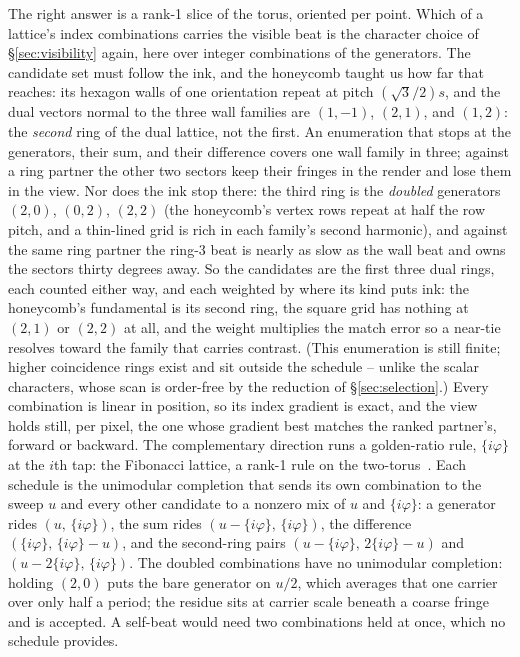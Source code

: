 The right answer is a rank-1 slice of the torus, oriented per point. Which of a
lattice's index combinations carries the visible beat is the character choice
of \S\ref{sec:visibility} again, here over integer combinations of the generators. The candidate
set must follow the ink, and the honeycomb taught us how far that reaches: its
hexagon walls of one orientation repeat at pitch $(\sqrt3/2)s$, and the dual
vectors normal to the three wall families are $(1,-1)$, $(2,1)$, and
$(1,2)$: the \emph{second} ring of the dual lattice, not the first. An
enumeration that stops at the generators, their sum, and their difference
covers one wall family in three; against a ring partner the other two sectors
keep their fringes in the render and lose them in the view. Nor does the ink
stop there: the third ring is the \emph{doubled} generators $(2,0)$, $(0,2)$,
$(2,2)$ (the honeycomb's vertex rows repeat at half the row pitch, and a
thin-lined grid is rich in each family's second harmonic), and against the
same ring partner the ring-3 beat is nearly as slow as the wall beat and owns
the sectors thirty degrees away. So the candidates are the first three dual
rings, each counted either way, and each weighted by where its kind puts
ink: the honeycomb's fundamental is its second ring, the square grid has
nothing at $(2,1)$ or $(2,2)$ at all, and the weight multiplies the match
error so a near-tie resolves toward the family that carries contrast. (This
enumeration is still finite; higher coincidence rings exist and sit outside
the schedule -- unlike the scalar characters, whose scan is order-free by the
reduction of \S\ref{sec:selection}.)
Every combination is linear in position, so its index gradient is exact, and the
view holds still, per pixel, the one whose gradient best matches the ranked
partner's, forward or backward. The complementary direction runs a golden-ratio
rule, $\{i\varphi\}$ at the $i$th tap: the Fibonacci lattice, a rank-1 rule
on the two-torus~\cite{Sloan1994Lattice, Keller2013Quasi}. Each schedule is the
unimodular completion that sends its own combination to the sweep $u$ and every
other candidate to a nonzero mix of $u$ and $\{i\varphi\}$: a generator rides
$(u,\,\{i\varphi\})$, the sum rides $(u-\{i\varphi\},\,\{i\varphi\})$, the
difference $(\{i\varphi\},\,\{i\varphi\}-u)$, and the second-ring pairs
$(u-\{i\varphi\},\, 2\{i\varphi\}-u)$ and $(u-2\{i\varphi\},\, \{i\varphi\})$.
The doubled combinations have no unimodular completion: holding $(2,0)$
puts the bare generator on $u/2$, which averages that one carrier over only
half a period; the residue sits at carrier scale beneath a coarse fringe and
is accepted. A self-beat would need two combinations held at once, which no
schedule provides.

